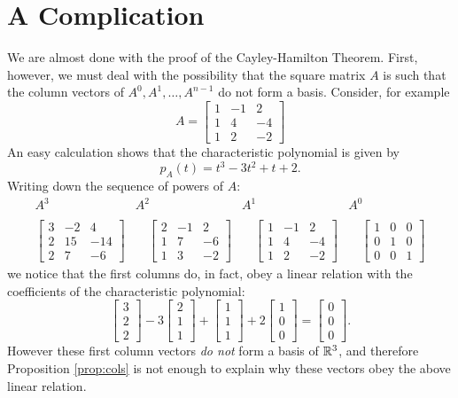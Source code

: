 \documentclass[12pt]{article}
\newcommand{\lb}{\left[}
\newcommand{\rb}{\right]}
\newcommand{\reals}{{\Bbb R}}
\newcommand{\bvector}[1]{\lb\begin{array}{r} #1 \end{array}\rb}
\begin{document}
\section{A Complication}
We are almost done with the proof of the Cayley-Hamilton
Theorem. First, however, we must deal with the possibility that the
square matrix $A$ is such that  the column vectors of $A^0, A^1,
\ldots, A^{n-1}$ do not form a basis.  Consider, for example 
$$
A=\lb\begin{array}{rrr}
 1 & -1 &  2 \\
 1 &  4 & -4 \\
 1 &  2 & -2 
\end{array}\rb
$$
An easy calculation shows that the characteristic polynomial is given
by
$$p_A(t)=t^3-3t^2+t+2.$$
Writing down the sequence of powers of $A$:
$$
\begin{array}{cccc}
A^3 & A^2 & A^1 & A^0\\
\\
\lb\begin{array}{rrr}
 3 & -2 &  4  \\
 2 & 15 & -14 \\
 2 &  7 &  -6 
\end{array}\rb
&\quad
\lb\begin{array}{rrr}
 2 & -1 &  2 \\
 1 &  7 & -6 \\
 1 &  3 & -2 
\end{array}\rb
&\quad
\lb\begin{array}{rrr}
 1 & -1 &  2 \\
 1 &  4 & -4 \\
 1 &  2 & -2 
\end{array}\rb
&\quad
\lb\begin{array}{rrr}
1&0&0\\
0&1&0\\
0&0&1
\end{array}\rb
\end{array}
$$
we notice that the first columns do, in fact, obey a linear relation
with the coefficients of the characteristic polynomial:
\begin{equation}
  \label{eq:comp0}
\bvector{3\\2\\2} 
-3\bvector{2\\1\\1}
+\bvector{1\\1\\1}
+2\bvector{1\\0\\0}
=
\bvector{0\\0\\0}.
\end{equation}
However these first column vectors {\em do not } form a basis of
$\reals^3$, and therefore Proposition \ref{prop:cols} is not enough
to explain why these vectors obey the above linear relation.
\end{document}
